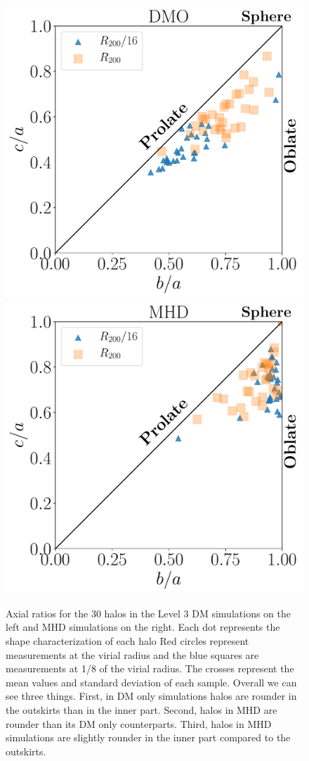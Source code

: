 \documentclass[a4paper,fleqn,usenatbib]{mnras}
\begin{document}
 
\begin{figure}
\begin{center}
\includegraphics[width=0.9\columnwidth]{Lvl_4_Triax_Plane_DM.pdf}
 \includegraphics[width=0.9\columnwidth]{Lvl_4_Triax_Plane_MHD.pdf}
\end{center}
\caption{Axial ratios for the 30 halos in the Level 3 DM simulations
  on the left and MHD simulations on the right.
   Each dot represents the shape characterization of each halo 
   Red circles represent measurements at the virial radius and the
   blue squares are measurements at 1/8 of the virial radius.   
   The crosses represent the mean values and standard deviation of
   each sample.
   Overall we can see three things. 
   First, in DM only simulations halos are rounder in the outskirts
   than in the inner part.
   Second, halos in MHD are rounder than its DM only counterparts.
   Third, halos in MHD simulations are slightly rounder in the inner
   part compared to the outskirts.}
  \label{fig:triaxiality_plane}
\end{figure}
\end{document}
